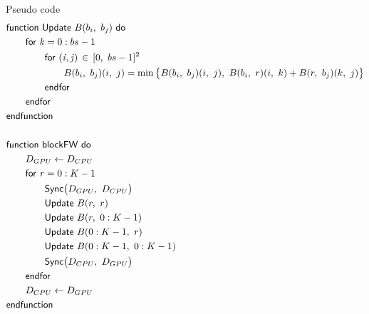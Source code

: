 \documentclass[12pt]{article}
\makeatletter
\renewenvironment{itemize}
{\list{$\bullet$}{\leftmargin\z@ \labelwidth\z@ \itemindent-\leftmargin
\let\makelabel\descriptionlabel}}
{\endlist}
\makeatother
\begin{document}
\begin{itemize}
    \newpage
    \item Pseudo code
    \vspace{-10pt}
    \begin{align*}
        &\mathsf{function \,\, Update} \,\, B(b_i, \,\, b_j) \,\, \mathsf{do} \makebox[.5\textwidth]{} \\  
        &\quad \quad \mathsf{for } \,\, \mathit{k} = 0:bs-1 \\
        &\quad \quad \quad \quad \mathsf{for } \,\, \mathit{(i, j)} \, \in \, [0, \,\, bs-1]^2 \\
        &\quad \quad \quad \quad \quad \quad B(b_i, \,\, b_j)(i, \,\, j) = \min\big\{B(b_i, \,\, b_j)(i, \,\, j), \,\, B(b_i, \,\, r)(i, \,\, k) + B(r, \,\, b_j)(k, \,\, j)\big\} \\
        &\quad \quad \quad \quad \mathsf{endfor} \\
        &\quad \quad \mathsf{endfor} \\
        &\mathsf{endfunction} \\ \\
        &\mathsf{function \,\, blockFW \,\, do} \\
        &\quad \quad D_{GPU} \leftarrow D_{CPU} \\
        &\quad \quad \mathsf{for} \,\, \mathit{r} = 0:K-1  \\
        &\quad \quad \quad \quad \mathsf{Sync} \big( D_{GPU}, \,\, D_{CPU} \big) \\
        &\quad \quad \quad \quad \mathsf{Update} \,\, B(r, \,\, r) \\
        &\quad \quad \quad \quad \mathsf{Update} \,\, B(r, \,\, 0:K-1) \\
        &\quad \quad \quad \quad \mathsf{Update} \,\, B(0:K-1, \,\, r) \\
        &\quad \quad \quad \quad \mathsf{Update} \,\, B(0:K-1, \,\, 0:K-1) \\
        &\quad \quad \quad \quad \mathsf{Sync} \big( D_{CPU}, \,\, D_{GPU} \big) \\
        &\quad \quad \mathsf{endfor} \\
        &\quad \quad D_{CPU} \leftarrow D_{GPU} \\
        &\mathsf{endfunction}
    \end{align*}
    \vspace{-10pt}
    \begin{figure}

\end{figure}
\end{itemize}
\end{document}
